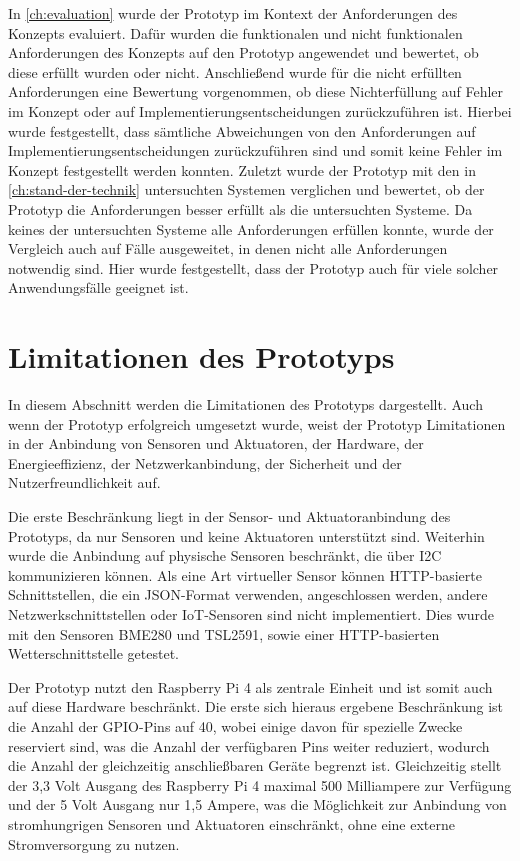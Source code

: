 In \cref{ch:evaluation} wurde der Prototyp im Kontext der Anforderungen des Konzepts evaluiert.
Dafür wurden die funktionalen und nicht funktionalen Anforderungen des Konzepts auf den Prototyp angewendet und bewertet, ob diese erfüllt wurden oder nicht.
Anschließend wurde für die nicht erfüllten Anforderungen eine Bewertung vorgenommen, ob diese Nichterfüllung auf Fehler im Konzept oder auf Implementierungsentscheidungen zurückzuführen ist.
Hierbei wurde festgestellt, dass sämtliche Abweichungen von den Anforderungen auf Implementierungsentscheidungen zurückzuführen sind und somit keine Fehler im Konzept festgestellt werden konnten.
Zuletzt wurde der Prototyp mit den in \cref{ch:stand-der-technik} untersuchten Systemen verglichen und bewertet, ob der Prototyp die Anforderungen besser erfüllt als die untersuchten Systeme.
Da keines der untersuchten Systeme alle Anforderungen erfüllen konnte, wurde der Vergleich auch auf Fälle ausgeweitet, in denen nicht alle Anforderungen notwendig sind.
Hier wurde festgestellt, dass der Prototyp auch für viele solcher Anwendungsfälle geeignet ist.



\section{Limitationen des Prototyps}
In diesem Abschnitt werden die Limitationen des Prototyps dargestellt.
Auch wenn der Prototyp erfolgreich umgesetzt wurde, weist der Prototyp Limitationen in der Anbindung von Sensoren und Aktuatoren, der Hardware, der Energieeffizienz, der Netzwerkanbindung, der Sicherheit und der Nutzerfreundlichkeit auf.

Die erste Beschränkung liegt in der Sensor- und Aktuatoranbindung des Prototyps, da nur Sensoren und keine Aktuatoren unterstützt sind.
Weiterhin wurde die Anbindung auf physische Sensoren beschränkt, die über I2C kommunizieren können.
Als eine Art virtueller Sensor können HTTP-basierte Schnittstellen, die ein JSON-Format verwenden, angeschlossen werden, andere Netzwerkschnittstellen oder IoT-Sensoren sind nicht implementiert.
Dies wurde mit den Sensoren BME280 und TSL2591, sowie einer HTTP-basierten Wetterschnittstelle getestet.

Der Prototyp nutzt den Raspberry Pi 4 als zentrale Einheit und ist somit auch auf diese Hardware beschränkt.
Die erste sich hieraus ergebene Beschränkung ist die Anzahl der GPIO-Pins auf 40, wobei einige davon für spezielle Zwecke reserviert sind, was die Anzahl der verfügbaren Pins weiter reduziert, wodurch die Anzahl der gleichzeitig anschließbaren Geräte begrenzt ist.
Gleichzeitig stellt der 3,3 Volt Ausgang des Raspberry Pi 4 maximal 500 Milliampere zur Verfügung und der 5 Volt Ausgang nur 1,5 Ampere, was die Möglichkeit zur Anbindung von stromhungrigen Sensoren und Aktuatoren einschränkt, ohne eine externe Stromversorgung zu nutzen.

